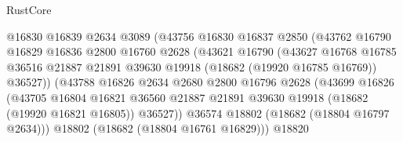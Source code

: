 \begin{lexlean}{RustCore}
\begin{coremodule}
                                    @16830
                                    @16839
                                    @2634
                                    @3089
                                    (@43756
                                      @16830
                                      @16837
                                      @2850
                                      (@43762
                                        @16790
                                        @16829
                                        @16836
                                        @2800
                                        @16760
                                        @2628
                                        (@43621
                                          @16790
                                          (@43627
                                            @16768
                                            @16785
                                            @36516
                                            @21887
                                            @21891
                                            @39630
                                            @19918
                                            (@18682 (@19920 @16785 @16769))
                                            @36527))
                                        (@43788
                                          @16826
                                          @2634
                                          @2680
                                          @2800
                                          @16796
                                          @2628
                                          (@43699
                                            @16826
                                            (@43705
                                              @16804
                                              @16821
                                              @36560
                                              @21887
                                              @21891
                                              @39630
                                              @19918
                                              (@18682 (@19920 @16821 @16805))
                                              @36527))
                                          @36574
                                          @18802
                                          (@18682 (@18804 @16797 @2634)))
                                        @18802
                                        (@18682 (@18804 @16761 @16829)))
                                      @18820

\end{coremodule}
\end{lexlean}
